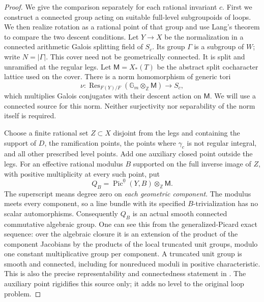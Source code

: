 \begin{proof}
We give the comparison separately for each rational invariant $c$.
First we construct a connected group acting on suitable full-level
subgroupoids of loops.  We then realize rotation as a rational point
of that group and use Lang's theorem to compare the two descent
conditions.
Let $Y\to X$ be the normalization in a connected arithmetic Galois
splitting field of $S_c$.  Its group $\Gamma$ is a subgroup of $W$;
write $N=|\Gamma|$.  This cover need not be geometrically connected.
It is split and unramified at the regular legs.  Let
$\mathsf M=X_*(T)$ be the abstract split cocharacter lattice used on
the cover.  There is a norm homomorphism of generic tori
\begin{equation}\label{rot:norm}
 \nu:\operatorname{Res}_{F(Y)/F}
          (\mathbb G_m\otimes_{\mathbb Z}\mathsf M)\longrightarrow S_c,
\end{equation}
which multiplies Galois conjugates with their descent action on
$\mathsf M$.  We will use a connected source for this norm.  Neither
surjectivity nor separability of the norm itself is required.

Choose a finite rational set $Z\subset X$ disjoint from the legs and
containing the support of $D$, the ramification points, the points
where $\gamma_c$ is not regular integral, and all other prescribed
level points.  Add one auxiliary closed point outside the legs.
For an effective rational modulus $B$ supported on the full inverse
image of $Z$, with positive multiplicity at every such point, put
\begin{equation}\label{rot:picard-source}
 Q_B=\operatorname{Pic}^{\underline 0}(Y,B)
                       \otimes_{\mathbb Z}\mathsf M.
\end{equation}
The superscript means degree zero on \emph{each geometric component}.
The modulus meets every component, so a line bundle with its specified
$B$-trivialization has no scalar automorphisms.  Consequently $Q_B$ is
an actual smooth connected commutative algebraic group.  One can see
this from the generalized-Picard exact sequence: over the algebraic
closure it is an extension of the product of the component Jacobians
by the products of the local truncated unit groups, modulo one
constant multiplicative group per component.  A truncated unit group
is smooth and connected, including for nonreduced moduli in positive
characteristic.  This is also the precise representability and
connectedness statement in \cite[Section~1.4, Proposition~1.6 and the
following paragraph]{JordanRibetScholl}.  The auxiliary point rigidifies this source
only; it adds no level to the original loop problem.


\end{proof}
